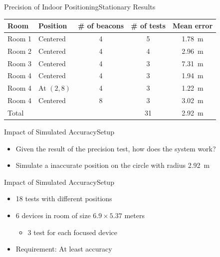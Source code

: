 \begin{frame}{Precision of Indoor Positioning}{Stationary Results}
  \centering\vfill
  \begin{tabular}{l|l c c c}
  	Room   & Position   & \# of beacons & \# of tests & Mean error        \\ \hline
  	Room 1 & Centered   & \num{4}       & 5           & \SI{1.78}{\meter} \\
  	Room 2 & Centered   & \num{4}       & 4           & \SI{2.96}{\meter} \\
  	Room 3 & Centered   & \num{4}       & 3           & \SI{7.31}{\meter} \\
  	Room 4 & Centered   & \num{4}       & 3           & \SI{1.94}{\meter} \\
  	Room 4 & At $(2,8)$ & \num{4}       & 3           & \SI{1.22}{\meter} \\
  	Room 4 & Centered   & \num{8}       & 3           & \SI{3.02}{\meter} \\ \hline
  	Total  &            &               & 31          & \SI{2.92}{\meter}
  \end{tabular}
\end{frame}

\begin{frame}{Impact of Simulated Accuracy}{Setup}
  \begin{itemize}
    \item Given the result of the precision test, how does the system work?
    \item Simulate a inaccurate position on the circle with radius \SI{2.92}{\meter}
  \end{itemize}
  \begin{center}
    \scalebox{0.8}{}
  \end{center}
\end{frame}

\begin{frame}{Impact of Simulated Accuracy}{Setup}
  \begin{itemize}
    \item 18 tests with different positions
    \item 6 devices in room of size $6.9 \times 5.37$ meters
    \begin{itemize}
      \item 3 test for each focused device
    \end{itemize}
    \item Requirement: At least  accuracy
  \end{itemize}
\end{frame}

